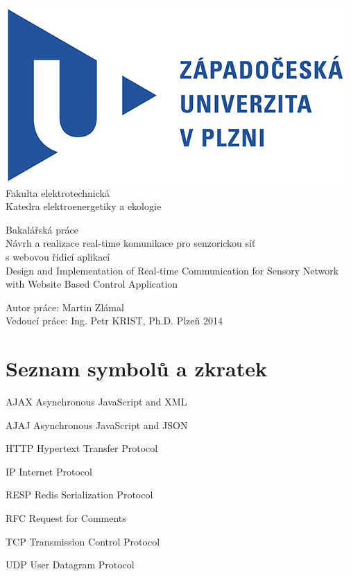 \documentclass[oneside,12pt,a4paper]{book} %
\makeatletter
\newcommand{\tocfill}{\cleaders\hbox{$\m@th \mkern\@dotsep mu . \mkern\@dotsep mu$}\hfill}
\newcommand{\abbrlabel}[1]{\makebox[\textwidth /2][l]{\textbf{#1}\ \tocfill}}
\newenvironment{abbreviations}{\begin{list}{}{\renewcommand{\makelabel}{\abbrlabel}%
        \setlength{\labelwidth}{\textwidth /2}\setlength{\leftmargin}{\labelwidth+\labelsep}%
                                              \setlength{\itemsep}{0pt}}}{\end{list}}
\makeatother
\begin{document}
\pagestyle{empty}
\begin{titlepage}
\noindent
\includegraphics[scale=1]{zcu.png} \\[0.3cm]
Fakulta elektrotechnická \\
Katedra elektroenergetiky a ekologie
\vspace{5cm}
\begin{center}
	{\Huge\sc Bakalářská práce} \\
	\vspace{1cm}
	{\large Návrh a realizace real-time komunikace pro senzorickou síť\\s webovou řídicí aplikací\\}
	\vspace{1cm}
	{\large Design and Implementation of Real-time Communication for Sensory Network with Website Based Control Application}
\end{center}
\vfill
Autor práce: Martin Zlámal\\
Vedoucí práce: Ing. Petr KRIST, Ph.D. \hfill Plzeň 2014
\end{titlepage}

%



%

\tableofcontents
\cleardoublepage
{}
{}
\listoffigures



\chapter*{Seznam symbolů a zkratek}
\noindent
\begin{abbreviations}
\item[AJAX]	Asynchronous JavaScript and XML
\item[AJAJ]	Asynchronous JavaScript and JSON
\item[HTTP]	Hypertext Transfer Protocol
\item[IP]	Internet Protocol
\item[RESP]	Redis Serialization Protocol
\item[RFC]	Request for Comments
\item[TCP]	Transmission Control Protocol
\item[UDP]	User Datagram Protocol
\end{abbreviations}
\end{document}
